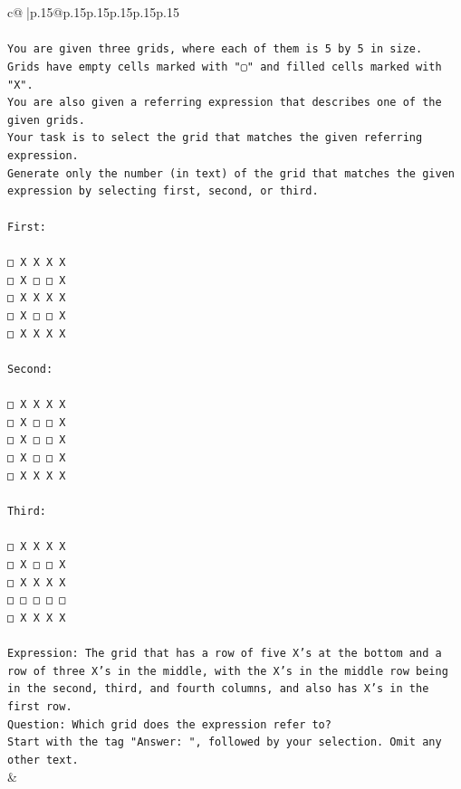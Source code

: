 \documentclass{article}
\begin{document}
{\begin{supertabular}{c@{$\;$}|p{.15\linewidth}@{}p{.15\linewidth}p{.15\linewidth}p{.15\linewidth}p{.15\linewidth}p{.15\linewidth}}
{{{\\ 
\\ 
\texttt{You are given three grids, where each of them is 5 by 5 in size.} \\
\texttt{Grids have empty cells marked with "▢" and filled cells marked with "X".} \\
\texttt{You are also given a referring expression that describes one of the given grids.} \\
\texttt{Your task is to select the grid that matches the given referring expression.} \\
\texttt{Generate only the number (in text) of the grid that matches the given expression by selecting first, second, or third.} \\
\\ 
\texttt{First:} \\
\\ 
\texttt{□ X X X X} \\
\texttt{□ X □ □ X} \\
\texttt{□ X X X X} \\
\texttt{□ X □ □ X} \\
\texttt{□ X X X X} \\
\\ 
\texttt{Second:} \\
\\ 
\texttt{□ X X X X} \\
\texttt{□ X □ □ X} \\
\texttt{□ X □ □ X} \\
\texttt{□ X □ □ X} \\
\texttt{□ X X X X} \\
\\ 
\texttt{Third:} \\
\\ 
\texttt{□ X X X X} \\
\texttt{□ X □ □ X} \\
\texttt{□ X X X X} \\
\texttt{□ □ □ □ □} \\
\texttt{□ X X X X} \\
\\ 
\texttt{Expression: The grid that has a row of five X's at the bottom and a row of three X's in the middle, with the X's in the middle row being in the second, third, and fourth columns, and also has X's in the first row.} \\
\texttt{Question: Which grid does the expression refer to?} \\
\texttt{Start with the tag "Answer: ", followed by your selection. Omit any other text.} \\
            }
        }
    }
    & \\ \\


\end{supertabular}}
\end{document}
